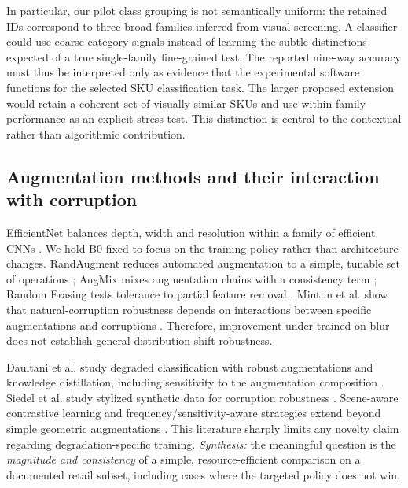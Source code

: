 \documentclass[sigconf,nonacm]{acmart}
\begin{document}
In particular, our pilot class grouping is not semantically uniform: the retained IDs correspond to three broad families inferred from visual screening. A classifier could use coarse category signals instead of learning the subtle distinctions expected of a true single-family fine-grained test. The reported nine-way accuracy must thus be interpreted only as evidence that the experimental software functions for the selected SKU classification task. The larger proposed extension would retain a coherent set of visually similar SKUs and use within-family performance as an explicit stress test. This distinction is central to the contextual rather than algorithmic contribution.

\subsection{Augmentation methods and their interaction with corruption}
EfficientNet balances depth, width and resolution within a family of efficient CNNs \cite{tan2019efficientnet}. We hold B0 fixed to focus on the training policy rather than architecture changes. RandAugment reduces automated augmentation to a simple, tunable set of operations \cite{cubuk2020randaugment}; AugMix mixes augmentation chains with a consistency term \cite{hendrycks2020augmix}; Random Erasing tests tolerance to partial feature removal \cite{zhong2020random}. Mintun et al. show that natural-corruption robustness depends on interactions between specific augmentations and corruptions \cite{mintun2021interaction}. Therefore, improvement under trained-on blur does not establish general distribution-shift robustness.

Daultani et al. study degraded classification with robust augmentations and knowledge distillation, including sensitivity to the augmentation composition \cite{daultani2024degraded}. Siedel et al. study stylized synthetic data for corruption robustness \cite{siedel2026stylized}. Scene-aware contrastive learning and frequency/sensitivity-aware strategies extend beyond simple geometric augmentations \cite{li2026scene,zheng2025adaptive}. This literature sharply limits any novelty claim regarding degradation-specific training. \emph{Synthesis:} the meaningful question is the \emph{magnitude and consistency} of a simple, resource-efficient comparison on a documented retail subset, including cases where the targeted policy does not win.
\end{document}

